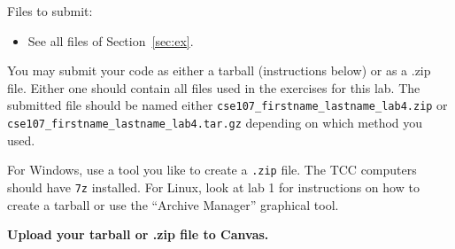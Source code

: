 \documentclass[11pt]{cselabheader}
\begin{document}
Files to submit:
\begin{itemize}
  \item See all files of Section~\ref{sec:ex}.
\end{itemize}

You may submit your code as either a tarball (instructions below) or as a .zip
file. Either one should contain all files used in the exercises for this lab.
The submitted file should be named either
\texttt{cse107\_firstname\_lastname\_lab4.zip} or
\texttt{cse107\_firstname\_lastname\_lab4.tar.gz} depending on which method you
used.

For Windows, use a tool you like to create a \texttt{.zip} file. The TCC
computers should have \texttt{7z} installed. For Linux, look at lab 1 for
instructions on how to create a tarball or use the ``Archive Manager'' graphical
tool.

\begin{center}
  \textbf{Upload your tarball or .zip file to Canvas.}
\end{center}
\end{document}
